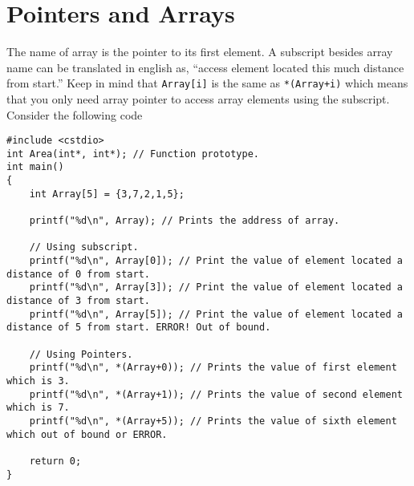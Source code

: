 \documentclass[12pt,a4paper]{article}
\begin{document}
\section{Pointers and Arrays}
The name of array is the pointer to its first element. A subscript besides array name can be translated in english as, ``access element located this much distance from start.'' Keep in mind that \verb|Array[i]| is the same as \verb|*(Array+i)| which means that you only need array pointer to access array elements using the subscript. Consider the following code
\begin{lstlisting}[caption={Arrays and Pointers}]
#include <cstdio>
int Area(int*, int*); // Function prototype.
int main()
{
	int Array[5] = {3,7,2,1,5};

	printf("%d\n", Array); // Prints the address of array.

	// Using subscript.
	printf("%d\n", Array[0]); // Print the value of element located a distance of 0 from start.
	printf("%d\n", Array[3]); // Print the value of element located a distance of 3 from start.
	printf("%d\n", Array[5]); // Print the value of element located a distance of 5 from start. ERROR! Out of bound.

	// Using Pointers.
	printf("%d\n", *(Array+0)); // Prints the value of first element which is 3.
	printf("%d\n", *(Array+1)); // Prints the value of second element which is 7.
	printf("%d\n", *(Array+5)); // Prints the value of sixth element which out of bound or ERROR.

	return 0;
}
\end{lstlisting}
\end{document}
